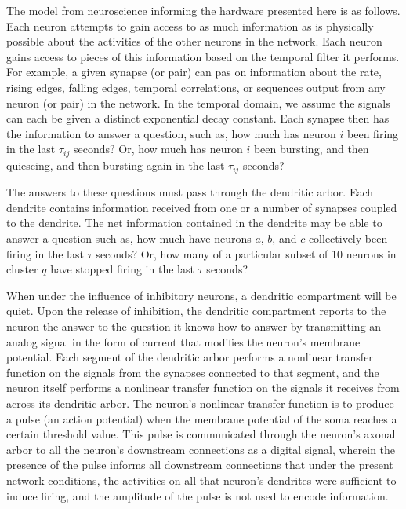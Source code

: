 \documentclass[twocolumn]{article}
\begin{document}
The model from neuroscience informing the hardware presented here is as follows. Each neuron attempts to gain access to as much information as is physically possible about the activities of the other neurons in the network. Each neuron gains access to pieces of this information based on the temporal filter it performs. For example, a given synapse (or pair) can pas on information about the rate, rising edges, falling edges, temporal correlations, or sequences output from any neuron (or pair) in the network. In the temporal domain, we assume the signals can each be given a distinct exponential decay constant. Each synapse then has the information to answer a question, such as, how much has neuron $i$ been firing in the last $\tau_{ij}$ seconds? Or, how much has neuron $i$ been bursting, and then quiescing, and then bursting again in the last $\tau_{ij}$ seconds? 

The answers to these questions must pass through the dendritic arbor. Each dendrite contains information received from one or a number of synapses coupled to the dendrite. The net information contained in the dendrite may be able to answer a question such as, how much have neurons $a$, $b$, and $c$ collectively been firing in the last $\tau$ seconds? Or, how many of a particular subset of 10 neurons in cluster $q$ have stopped firing in the last $\tau$ seconds? 

When under the influence of inhibitory neurons, a dendritic compartment will be quiet. Upon the release of inhibition, the dendritic compartment reports to the neuron the answer to the question it knows how to answer by transmitting an analog signal in the form of current that modifies the neuron's membrane potential. Each segment of the dendritic arbor performs a nonlinear transfer function on the signals from the synapses connected to that segment, and the neuron itself performs a nonlinear transfer function on the signals it receives from across its dendritic arbor. The neuron's nonlinear transfer function is to produce a pulse (an action potential) when the membrane potential of the soma reaches a certain threshold value. This pulse is communicated through the neuron's axonal arbor to all the neuron's downstream connections as a digital signal, wherein the presence of the pulse informs all downstream connections that under the present network conditions, the activities on all that neuron's dendrites were sufficient to induce firing, and the amplitude of the pulse is not used to encode information.
\end{document}
